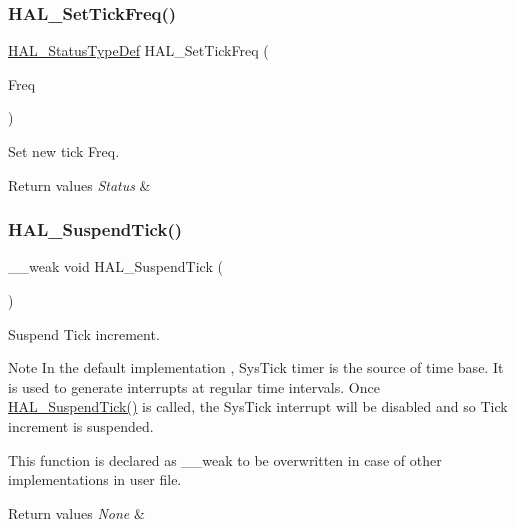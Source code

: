 \subsubsection{\texorpdfstring{H\+A\+L\+\_\+\+Set\+Tick\+Freq()}{HAL\_SetTickFreq()}}
{\footnotesize\ttfamily \hyperlink{stm32f4xx__hal__def_8h_a63c0679d1cb8b8c684fbb0632743478f}{H\+A\+L\+\_\+\+Status\+Type\+Def} H\+A\+L\+\_\+\+Set\+Tick\+Freq (\begin{DoxyParamCaption}\item[{H\+A\+L\+\_\+\+Tick\+Freq\+Type\+Def}]{Freq }\end{DoxyParamCaption})}



Set new tick Freq. 


\begin{DoxyRetVals}{Return values}
{\em Status} & \\
\hline
\end{DoxyRetVals}
\mbox{\label{group___h_a_l___exported___functions___group2_ga84ae4b045c45d49d96b2b02e2dc516b6}} 
\subsubsection{\texorpdfstring{H\+A\+L\+\_\+\+Suspend\+Tick()}{HAL\_SuspendTick()}}
{\footnotesize\ttfamily \+\_\+\+\_\+weak void H\+A\+L\+\_\+\+Suspend\+Tick (\begin{DoxyParamCaption}\item[{void}]{ }\end{DoxyParamCaption})}



Suspend Tick increment. 

\begin{DoxyNote}{Note}
In the default implementation , Sys\+Tick timer is the source of time base. It is used to generate interrupts at regular time intervals. Once \hyperlink{group___h_a_l___exported___functions___group2_ga84ae4b045c45d49d96b2b02e2dc516b6}{H\+A\+L\+\_\+\+Suspend\+Tick()} is called, the Sys\+Tick interrupt will be disabled and so Tick increment is suspended. 

This function is declared as \+\_\+\+\_\+weak to be overwritten in case of other implementations in user file. 
\end{DoxyNote}

\begin{DoxyRetVals}{Return values}
{\em None} & \\
\hline
\end{DoxyRetVals}
